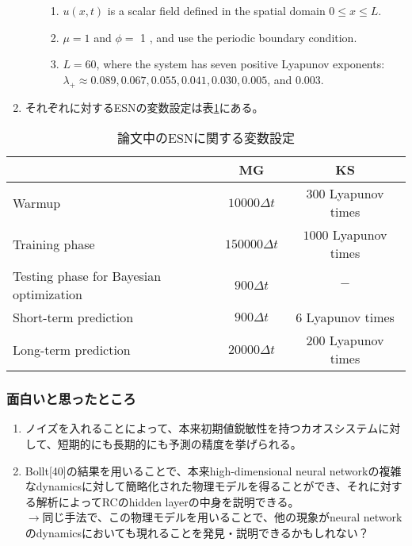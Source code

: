 \begin{enumerate}
\begin{enumerate}
    \begin{enumerate}
      \item $u(x, t)$ is a scalar field defined in the spatial domain $0 \leqslant x \leqslant L$.
      \item $\mu=1$ and $\phi=$ 1 , and use the periodic boundary condition.
      \item $L=60$, where the system has seven positive Lyapunov exponents:\\ $\lambda_{+} \approx 0.089,0.067,0.055,0.041,0.030,0.005$, and 0.003. 
    \end{enumerate}
  \end{enumerate}
  \item それぞれに対するESNの変数設定は表\ref{tab:ESN_parameters_inpaper}にある。
\end{enumerate}

\begin{table}[h!]
  \centering
  \begin{tabular}{lcc}
      \toprule
      & MG & KS \\
      \midrule
      Warmup & $10000\Delta t$ & $300$ Lyapunov times \\
      Training phase & $150000\Delta t$ & $1000$ Lyapunov times \\
      Testing phase for Bayesian optimization & $900\Delta t$ & $-$ \\
      Short-term prediction & $900\Delta t$ & $6$ Lyapunov times \\
      Long-term prediction & $20000\Delta t$ & $200$ Lyapunov times \\
      \bottomrule
  \end{tabular}
  \caption{論文中のESNに関する変数設定}
  \label{tab:ESN_parameters_inpaper}
\end{table}


\subsubsection{面白いと思ったところ}
\begin{enumerate}
  \item ノイズを入れることによって、本来初期値鋭敏性を持つカオスシステムに対して、短期的にも長期的にも予測の精度を挙げられる。
  \item Bollt[40]の結果を用いることで、本来high-dimensional neural networkの複雑なdynamicsに対して簡略化された物理モデルを得ることができ、それに対する解析によってRCのhidden layerの中身を説明できる。
  \\$\longrightarrow$同じ手法で、この物理モデルを用いることで、他の現象がneural networkのdynamicsにおいても現れることを発見・説明できるかもしれない？
\end{enumerate}

